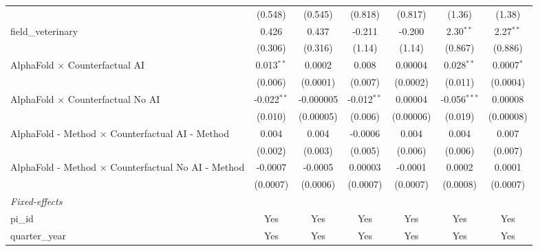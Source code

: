 \begin{tabular}{lcccccc}
                                                               & (0.548)        & (0.545)        & (0.818)        & (0.817)        & (1.36)         & (1.38)\\   
   field\_veterinary                                           & 0.426          & 0.437          & -0.211         & -0.200         & 2.30$^{**}$    & 2.27$^{**}$\\   
                                                               & (0.306)        & (0.316)        & (1.14)         & (1.14)         & (0.867)        & (0.886)\\   
   AlphaFold $\times$ Counterfactual AI                        & 0.013$^{**}$   & 0.0002         & 0.008          & 0.00004        & 0.028$^{**}$   & 0.0007$^{*}$\\   
                                                               & (0.006)        & (0.0001)       & (0.007)        & (0.0002)       & (0.011)        & (0.0004)\\   
   AlphaFold $\times$ Counterfactual No AI                     & -0.022$^{**}$  & -0.000005      & -0.012$^{**}$  & 0.00004        & -0.056$^{***}$ & 0.00008\\   
                                                               & (0.010)        & (0.00005)      & (0.006)        & (0.00006)      & (0.019)        & (0.00008)\\   
   AlphaFold - Method $\times$ Counterfactual AI - Method      & 0.004          & 0.004          & -0.0006        & 0.004          & 0.004          & 0.007\\   
                                                               & (0.002)        & (0.003)        & (0.005)        & (0.006)        & (0.006)        & (0.007)\\   
   AlphaFold - Method $\times$ Counterfactual No AI - Method   & -0.0007        & -0.0005        & 0.00003        & -0.0001        & 0.0002         & 0.0001\\   
                                                               & (0.0007)       & (0.0006)       & (0.0007)       & (0.0007)       & (0.0008)       & (0.0007)\\   
   \midrule
   \emph{Fixed-effects}\\
   pi\_id                                                      & Yes            & Yes            & Yes            & Yes            & Yes            & Yes\\  
   quarter\_year                                               & Yes            & Yes            & Yes            & Yes            & Yes            & Yes\\  

\end{tabular}
